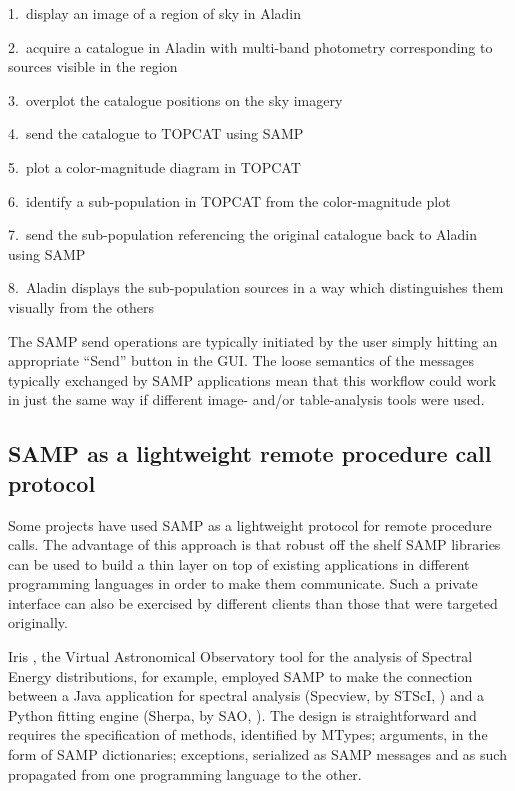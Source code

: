 \documentclass[11pt,twoside]{article}
\begin{document}
1.\ display an image of a region of sky in Aladin

2.\ acquire a catalogue in Aladin with multi-band photometry
    corresponding to sources visible in the region

3.\ overplot the catalogue positions on the sky imagery

4.\ send the catalogue to TOPCAT using SAMP

5.\ plot a color-magnitude diagram in TOPCAT

6.\ identify a sub-population in TOPCAT from the color-magnitude plot

7.\ send the sub-population referencing the original catalogue
    back to Aladin using SAMP

8.\ Aladin displays the sub-population sources in a way which
    distinguishes them visually from the others

The SAMP send operations are typically initiated by the user
simply hitting an appropriate ``Send'' button in the GUI.
The loose semantics of the messages typically exchanged by SAMP
applications mean that this workflow could work in just the same
way if different image- and/or table-analysis tools were used.

\subsection{SAMP as a lightweight remote procedure call protocol}

Some projects have used SAMP as a lightweight protocol for remote procedure
calls. The advantage of this approach is that robust off the shelf SAMP
libraries can be used to build a thin layer on top of existing applications
in different programming languages in order to make them communicate. Such
a private interface can also be exercised by different clients than those
that were targeted originally.

Iris \citep{2012ASPC..461..893D}, the Virtual Astronomical Observatory
tool for the analysis of Spectral Energy distributions, for example,
employed SAMP to make the connection between a Java application for
spectral analysis (Specview, by STScI, \citet{2000ASPC..216...79B}) and a
Python fitting engine (Sherpa, by SAO, \citet{2007ASPC..376..543D}). The
design is straightforward and requires the specification of methods,
identified by MTypes; arguments, in the form of SAMP dictionaries;
exceptions, serialized as SAMP messages and as such propagated from one
programming language to the other.
\end{document}
